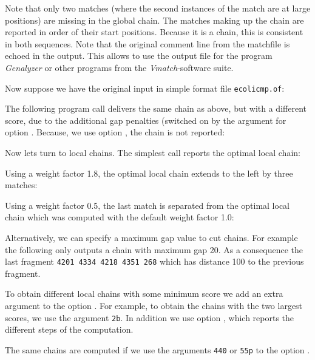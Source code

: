 \documentclass[12pt]{article}
\newcommand{\EXECUTE}[1]{}
\begin{document}
\EXECUTE{chain2dim -global ecolicmp.vm}

Note that only two matches (where the second instances of the match
are at large positions) are missing in the global chain. The matches 
making up the chain are reported in order of their start positions. 
Because it is a chain, this is consistent in both sequences. Note that 
the original comment line
from the matchfile is echoed in the output. This allows to use the 
output file for the program \textit{Genalyzer} or other programs
from the \textit{Vmatch}-software suite.

Now suppose we have the original input in simple format file 
\texttt{ecolicmp.of}:

\EXECUTE{cat ecolicmp.of}

The following program call
delivers the same chain as above, but with a different score, due to
the additional gap penalties (switched on by the argument 
for option . Because, we use option 
, the chain is not reported:

\EXECUTE{chain2dim -silent -global gc ecolicmp.of}

Now lets turn to local chains. The simplest call reports the optimal
local chain:

\EXECUTE{chain2dim -local ecolicmp.of}

Using a weight factor 1.8, the optimal local chain extends 
to the left by three matches:

\EXECUTE{chain2dim -wf 1.8 -local ecolicmp.of}

Using a weight factor 0.5, the last match is separated from
the optimal local chain which was computed with the default weight factor 1.0:

\EXECUTE{chain2dim -wf 0.5 -local ecolicmp.of}

Alternatively, we can specify a maximum gap value to cut chains. For example
the following only outputs a chain with maximum gap 20. As a consequence
the last fragment \texttt{4201 4334 4218 4351 268} which has distance
100 to the previous fragment.

\EXECUTE{chain2dim -local -maxgap 20 ecolicmp.of}

To obtain different local chains with some minimum score we add an
extra argument to the option . For example, to obtain
the chains with the two largest scores, we use the argument \texttt{2b}.
In addition we use option , which reports the 
different steps of the computation.

\EXECUTE{chain2dim -local 2b -v ecolicmp.of}

The same chains are computed if we use the arguments \texttt{440} or 
\texttt{55p} to the option .

\EXECUTE{chain2dim -local 55p -silent ecolicmp.of}
\end{document}
